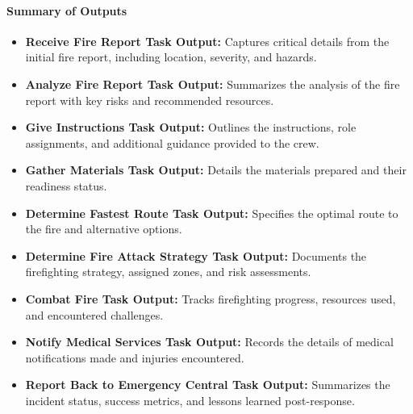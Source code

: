 \paragraph{Summary of Outputs}
\begin{itemize}
    \item \textbf{Receive Fire Report Task Output:} Captures critical details from the initial fire report, including location, severity, and hazards.
    \item \textbf{Analyze Fire Report Task Output:} Summarizes the analysis of the fire report with key risks and recommended resources.
    \item \textbf{Give Instructions Task Output:} Outlines the instructions, role assignments, and additional guidance provided to the crew.
    \item \textbf{Gather Materials Task Output:} Details the materials prepared and their readiness status.
    \item \textbf{Determine Fastest Route Task Output:} Specifies the optimal route to the fire and alternative options.
    \item \textbf{Determine Fire Attack Strategy Task Output:} Documents the firefighting strategy, assigned zones, and risk assessments.
    \item \textbf{Combat Fire Task Output:} Tracks firefighting progress, resources used, and encountered challenges.
    \item \textbf{Notify Medical Services Task Output:} Records the details of medical notifications made and injuries encountered.
    \item \textbf{Report Back to Emergency Central Task Output:} Summarizes the incident status, success metrics, and lessons learned post-response.
\end{itemize}
